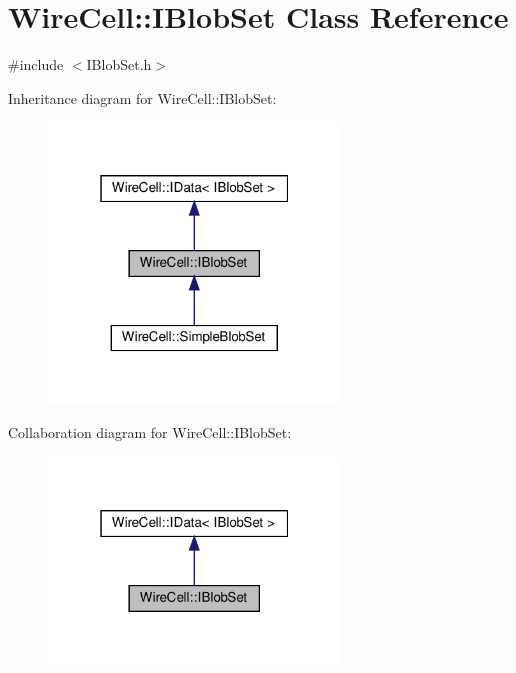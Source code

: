 \hypertarget{class_wire_cell_1_1_i_blob_set}{}\section{Wire\+Cell\+:\+:I\+Blob\+Set Class Reference}
\label{class_wire_cell_1_1_i_blob_set}


{\ttfamily \#include $<$I\+Blob\+Set.\+h$>$}



Inheritance diagram for Wire\+Cell\+:\+:I\+Blob\+Set\+:
\nopagebreak
\begin{figure}[H]
\begin{center}
\leavevmode
\includegraphics[width=220pt]{class_wire_cell_1_1_i_blob_set__inherit__graph}
\end{center}
\end{figure}


Collaboration diagram for Wire\+Cell\+:\+:I\+Blob\+Set\+:
\nopagebreak
\begin{figure}[H]
\begin{center}
\leavevmode
\includegraphics[width=220pt]{class_wire_cell_1_1_i_blob_set__coll__graph}
\end{center}
\end{figure}
